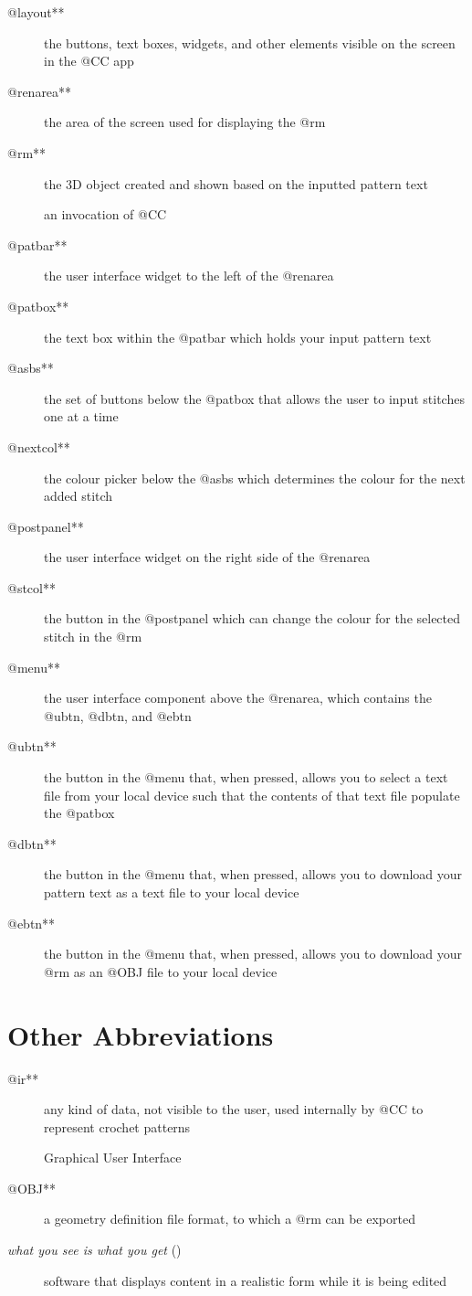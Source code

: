 \documentclass[main.tex]{subfiles}
\begin{document}
\begin{description}
\item[@layout**] the buttons, text boxes, widgets, and other elements visible on the screen in the @CC app
\item[@renarea**] the area of the screen used for displaying the @rm
\item[@rm**] the 3D object created and shown based on the inputted pattern text
\item[] an invocation of @CC
\item[@patbar**] the user interface widget to the left of the @renarea
\item[@patbox**] the text box within the @patbar which holds your input pattern text
\item[@asbs**] the set of buttons below the @patbox that allows the user to input stitches one at a time
\item[@nextcol**] the colour picker below the @asbs which determines the colour for the next added stitch
\item[@postpanel**] the user interface widget on the right side of the @renarea
\item[@stcol**] the button in the @postpanel which can change the colour for the selected stitch in the @rm
\item[@menu**] the user interface component above the @renarea, which contains the @ubtn, @dbtn, and @ebtn
\item[@ubtn**] the button in the @menu that, when pressed, allows you to select a text file from your local device such that the contents of that text file populate the @patbox
\item[@dbtn**] the button in the @menu that, when pressed, allows you to download your pattern text as a text file to your local device
\item[@ebtn**] the button in the @menu that, when pressed, allows you to download your @rm as an @OBJ file to your local device
\end{description}

\section{Other Abbreviations}

\begin{description}
\item[@ir**] any kind of data, not visible to the user, used internally by @CC to represent crochet patterns
\item[] Graphical User Interface
\item[@OBJ**] a geometry definition file format, to which a @rm can be exported
\item[\emph{what you see is what you get} ()] software that displays content in a realistic form while it is being edited
\end{description}
\end{document}
